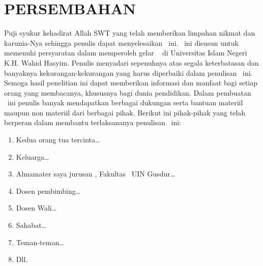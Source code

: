 %
%
%
\chapter*{PERSEMBAHAN}

Puji syukur kehadirat Allah SWT yang telah memberikan limpahan nikmat dan karunia-Nya
sehingga penulis dapat menyelesaikan \type~ini. \Type~ini disusun untuk memenuhi persyaratan
dalam memperoleh gelar \gelar~ di Universitas Islam Negeri K.H. Wahid Hasyim.
Penulis menyadari sepenuhnya atas segala keterbatasan dan banyaknya kekurangan-kekurangan
yang harus diperbaiki dalam penulisan \type~ini.
Semoga hasil penelitian ini dapat memberikan informasi dan manfaat bagi setiap orang
yang membacanya, khususnya bagi dunia pendidikan.
Dalam pembuatan \type~ini penulis banyak mendapatkan berbagai dukungan serta bantuan materiil
maupun non materiil dari berbagai pihak.
Berikut ini pihak-pihak yang telah berperan dalam membantu terlaksananya penulisan \type~ini:

\begin{enumerate}
 \item{Kedua orang tua tercinta\ldots}
 \item{Keluarga\ldots}
 \item{Almamater saya jurusan \program, Fakultas \fakultas~UIN Gusdur\ldots}
 \item{Dosen pembimbing\ldots}
 \item{Dosen Wali\ldots}
 \item{Sahabat\ldots}
 \item{Teman-teman\ldots}
 \item{Dll.}
\end{enumerate}


\newpage

